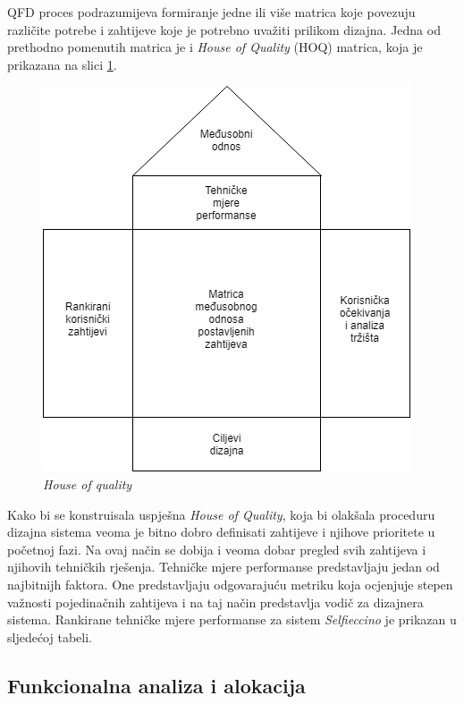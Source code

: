 \documentclass[12pt]{article}
\begin{document}
\newpage

QFD proces podrazumijeva formiranje jedne ili vi\v{s}e matrica koje povezuju razli\v{c}ite potrebe i zahtijeve koje je potrebno uva\v{z}iti prilikom dizajna. Jedna od prethodno pomenutih matrica je i \textit{House of Quality} (HOQ) matrica, koja je prikazana na slici \ref{hoq}.  

\begin{figure}[!h]
\centering
\includegraphics[scale=0.8]{hoq}
\caption{\textit{House of quality}}
\label{hoq}
\end{figure}
 
Kako bi se konstruisala uspje\v{s}na \textit{House of Quality}, koja bi olak\v{s}ala proceduru dizajna sistema veoma je bitno dobro definisati zahtijeve i njihove prioritete u po\v{c}etnoj fazi. Na ovaj na\v{c}in se dobija i veoma dobar pregled svih zahtijeva i njihovih tehni\v{c}kih rje\v{s}enja. Tehni\v{c}ke mjere performanse predstavljaju jedan od najbitnijh faktora. One predstavljaju odgovaraju\'cu metriku koja ocjenjuje stepen va\v{z}nosti pojedina\v{c}nih zahtijeva i na taj na\v{c}in predstavlja vodi\v{c} za dizajnera sistema. Rankirane tehni\v{c}ke mjere performanse za sistem \textit{Selfieccino} je prikazan u sljede\'coj tabeli.

\newpage

\subsection{Funkcionalna analiza i alokacija}
\end{document}
